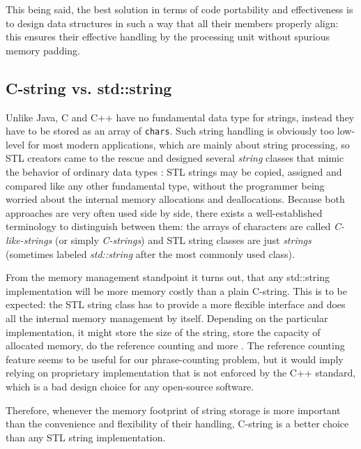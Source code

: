 This being said, the best solution in terms of code portability and effectiveness
is to design data structures in such a way that all their members properly align:
this ensures their effective handling by the processing unit without spurious memory padding.

\subsection{C-string vs. std::string}
\label{sec:strings}

Unlike Java, C and C++ have no fundamental data type for strings, instead they have
to be stored as an array of \texttt{chars}.
Such string handling is obviously too low-level for most modern applications,
which are mainly about string processing, so STL creators came to the rescue and designed
several \emph{string} classes that mimic the behavior of ordinary data types
\citep[Chapter 11]{josuttis:stl}:
STL strings may be copied, assigned and compared like any other fundamental type,
without the programmer being worried about the internal memory allocations and deallocations.
Because both approaches are very often used side by side, there exists a well-established
terminology to distinguish between them:
the arrays of characters are called \emph{C-like-strings} (or simply \emph{C-strings}) and
STL string classes are just \emph{strings} (sometimes labeled \emph{std::string} after the
most commonly used class).

From the memory management standpoint it turns out, that any std::string
implementation will be more memory costly than a plain C-string.
This is to be expected: the STL string class has to provide a more flexible interface
and does all the internal memory management by itself.
Depending on the particular implementation, it might store the size of the string,
store the capacity of allocated memory, do the reference counting and more
\citep[Item 15]{meyers:effectivestl}.
The reference counting feature seems to be useful for our phrase-counting problem,
but it would imply relying on proprietary implementation that is not enforced by
the C++ standard, which is a bad design choice for any open-source software.

\newpage

Therefore, whenever the memory footprint of string storage is more important than
the convenience and flexibility of their handling, C-string is a better choice
than any STL string implementation.


